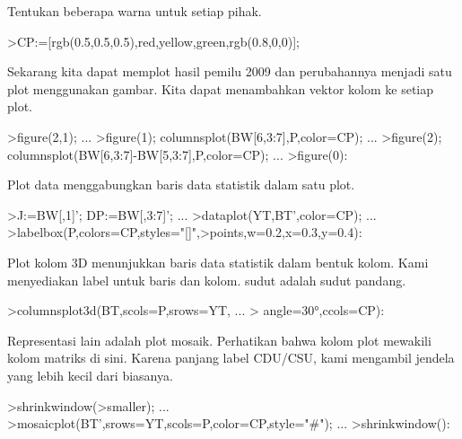 \documentclass[a4paper,10pt]{article}
\begin{document}
\begin{eulernotebook}
\begin{eulercomment}
Tentukan beberapa warna untuk setiap pihak.
\end{eulercomment}
\begin{eulerprompt}
>CP:=[rgb(0.5,0.5,0.5),red,yellow,green,rgb(0.8,0,0)];
\end{eulerprompt}
\begin{eulercomment}
Sekarang kita dapat memplot hasil pemilu 2009 dan perubahannya menjadi
satu plot menggunakan gambar. Kita dapat menambahkan vektor kolom ke
setiap plot.
\end{eulercomment}
\begin{eulerprompt}
>figure(2,1);  ...
>figure(1); columnsplot(BW[6,3:7],P,color=CP); ...
>figure(2); columnsplot(BW[6,3:7]-BW[5,3:7],P,color=CP);  ...
>figure(0):
\end{eulerprompt}
\begin{eulercomment}
Plot data menggabungkan baris data statistik dalam satu plot.
\end{eulercomment}
\begin{eulerprompt}
>J:=BW[,1]'; DP:=BW[,3:7]'; ...
>dataplot(YT,BT',color=CP);  ...
>labelbox(P,colors=CP,styles="[]",>points,w=0.2,x=0.3,y=0.4):
\end{eulerprompt}
\begin{eulercomment}
Plot kolom 3D menunjukkan baris data statistik dalam bentuk kolom.
Kami menyediakan label untuk baris dan kolom. sudut adalah sudut
pandang.
\end{eulercomment}
\begin{eulerprompt}
>columnsplot3d(BT,scols=P,srows=YT, ...
>  angle=30°,ccols=CP):
\end{eulerprompt}
\begin{eulercomment}
Representasi lain adalah plot mosaik. Perhatikan bahwa kolom plot
mewakili kolom matriks di sini. Karena panjang label CDU/CSU, kami
mengambil jendela yang lebih kecil dari biasanya.
\end{eulercomment}
\begin{eulerprompt}
>shrinkwindow(>smaller);  ...
>mosaicplot(BT',srows=YT,scols=P,color=CP,style="#"); ...
>shrinkwindow():
\end{eulerprompt}
\begin{eulercomment}

\end{eulercomment}
\end{eulernotebook}
\end{document}
